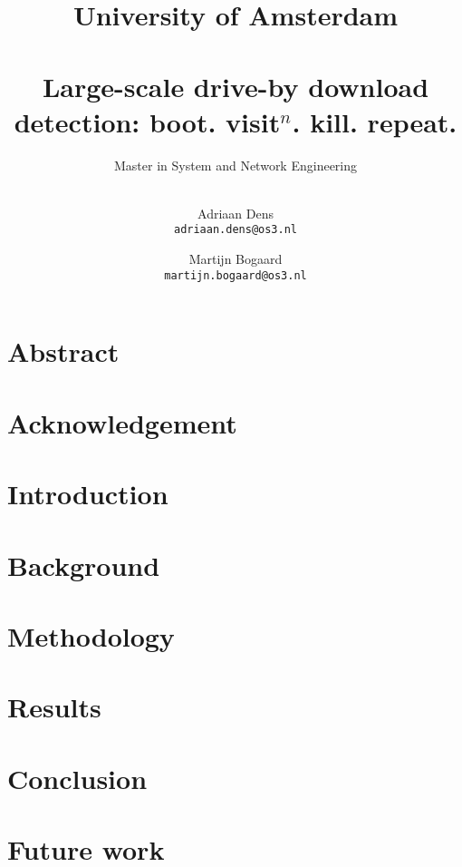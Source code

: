 \documentclass{scrartcl}
\title{University of Amsterdam \\[1cm] \horizontalrule{1pt}\\[0.5cm]Large-scale drive-by download detection: boot. visit$^n$. kill. repeat.}
\subtitle{Master in System and Network Engineering \\[0.5cm] \horizontalrule{1pt} \\[10cm] }
\author{
  Adriaan Dens\\
   \texttt{adriaan.dens@os3.nl}
  \and
  Martijn Bogaard\\
   \texttt{martijn.bogaard@os3.nl}
}
\begin{document}

\maketitle

\clearpage

\section*{Abstract}

\clearpage

\section*{Acknowledgement}

\clearpage

\tableofcontents

\clearpage


\section{Introduction}


\clearpage

\section{Background}


\clearpage

\section{Methodology}


\clearpage

\section{Results}


\clearpage

\section{Conclusion}


\clearpage

\section{Future work}


\clearpage



\end{document}
